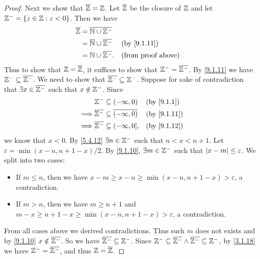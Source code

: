 \begin{proof}
	Next we show that \(\overline{\mathbb{Z}} = \mathbb{Z}\).
	Let \(\overline{\mathbb{Z}}\) be the closure of \(\mathbb{Z}\) and let \(\mathbb{Z}^- = \left\lbrace z \in \mathbb{Z} : z < 0\right\rbrace\).
	Then we have
	\begin{align*}
		\overline{\Z} & = \overline{\N \cup \Z^-}                                           \\
		              & = \overline{\N} \cup \overline{\Z^-} &  & \by{9.1.11}               \\
		              & = \N \cup \overline{\Z^-}.           &  & \text{(from proof above)}
	\end{align*}
	Thus to show that \(\mathbb{Z} = \overline{\mathbb{Z}}\), it suffices to show that \(\mathbb{Z}^- = \overline{\mathbb{Z}^-}\).
	By \cref{9.1.11} we have \(\mathbb{Z}^- \subseteq \overline{\mathbb{Z}^-}\).
	We need to show that \(\overline{\mathbb{Z}^-} \subseteq \mathbb{Z}^-\).
	Suppose for sake of contradiction that \(\exists x \in \overline{\mathbb{Z}^-}\) such that \(x \notin \mathbb{Z}^-\).
	Since
	\begin{align*}
		         & \Z^- \subseteq (-\infty, 0)                       &  & \by{9.1.1}  \\
		\implies & \overline{\Z^-} \subseteq \overline{(-\infty, 0)} &  & \by{9.1.11} \\
		\implies & \overline{\Z^-} \subseteq (-\infty, 0],           &  & \by{9.1.12}
	\end{align*}
	we know that \(x < 0\).
	By \cref{5.4.12} \(\exists n \in \mathbb{Z}^-\) such that \(n < x < n + 1\).
	Let \(\varepsilon = \min(x - n, n + 1 - x) / 2\).
	By \cref{9.1.10}, \(\exists m \in \mathbb{Z}^-\) such that \(\left\lvert x - m\right\rvert \leq \varepsilon\).
	We split into two cases:
	\begin{itemize}
		\item If \(m \leq n\), then we have \(x - m \geq x - n \geq \min(x - n, n + 1 - x) > \varepsilon\), a contradiction.
		\item If \(m > n\), then we have \(m \geq n + 1\) and \(m - x \geq n + 1 - x \geq \min(x - n, n + 1 - x) > \varepsilon\), a contradiction.
	\end{itemize}
	From all cases above we derived contradictions.
	Thus such \(m\) does not exists and by \cref{9.1.10} \(x \notin \overline{\mathbb{Z}^-}\).
	So we have \(\overline{\mathbb{Z}^-} \subseteq \mathbb{Z}^-\).
	Since \(\mathbb{Z}^- \subseteq \overline{\mathbb{Z}^-} \land \overline{\mathbb{Z}^-} \subseteq \mathbb{Z}^-\), by \cref{3.1.18} we have \(\mathbb{Z}^- = \overline{\mathbb{Z}^-}\), and thus \(\mathbb{Z} = \overline{\mathbb{Z}}\).


\end{proof}
